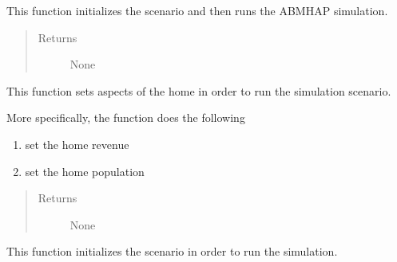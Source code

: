 \documentclass[letterpaper,10pt,english]{sphinxmanual}
\begin{document}
\begin{fulllineitems}
\begin{fulllineitems}
\begin{quote}
\begin{description}
\end{description}\end{quote}

\end{fulllineitems}


\begin{fulllineitems}
\label{scenario:scenario.Scenario.run}
This function initializes the scenario and then runs the ABMHAP simulation.
\begin{quote}\begin{description}
\item[{Returns}] \leavevmode
None

\end{description}\end{quote}

\end{fulllineitems}


\begin{fulllineitems}
\label{scenario:scenario.Scenario.set_home}
This function sets aspects of the home in order to run the simulation scenario.

More specifically, the function does the following
\begin{enumerate}
\item {} 
set the home revenue

\item {} 
set the home population

\end{enumerate}
\begin{quote}\begin{description}
\item[{Returns}] \leavevmode
None

\end{description}\end{quote}

\end{fulllineitems}


\begin{fulllineitems}
\label{scenario:scenario.Scenario.set_state}
This function initializes the scenario in order to run the simulation.


\end{fulllineitems}
\end{fulllineitems}
\end{document}
